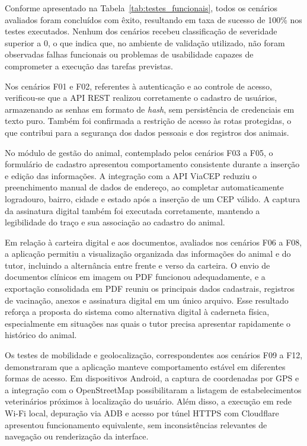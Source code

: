\documentclass{UNESC}
\begin{document}
Conforme apresentado na Tabela~\ref{tab:testes_funcionais}, todos os cenários avaliados foram concluídos com êxito, resultando em taxa de sucesso de 100\% nos testes executados. Nenhum dos cenários recebeu classificação de severidade superior a 0, o que indica que, no ambiente de validação utilizado, não foram observadas falhas funcionais ou problemas de usabilidade capazes de comprometer a execução das tarefas previstas.

Nos cenários F01 e F02, referentes à autenticação e ao controle de acesso, verificou-se que a API REST realizou corretamente o cadastro de usuários, armazenando as senhas em formato de \textit{hash}, sem persistência de credenciais em texto puro. Também foi confirmada a restrição de acesso às rotas protegidas, o que contribui para a segurança dos dados pessoais e dos registros dos animais.

No módulo de gestão do animal, contemplado pelos cenários F03 a F05, o formulário de cadastro apresentou comportamento consistente durante a inserção e edição das informações. A integração com a API ViaCEP reduziu o preenchimento manual de dados de endereço, ao completar automaticamente logradouro, bairro, cidade e estado após a inserção de um CEP válido. A captura da assinatura digital também foi executada corretamente, mantendo a legibilidade do traço e sua associação ao cadastro do animal.

Em relação à carteira digital e aos documentos, avaliados nos cenários F06 a F08, a aplicação permitiu a visualização organizada das informações do animal e do tutor, incluindo a alternância entre frente e verso da carteira. O envio de documentos clínicos em imagem ou PDF funcionou adequadamente, e a exportação consolidada em PDF reuniu os principais dados cadastrais, registros de vacinação, anexos e assinatura digital em um único arquivo. Esse resultado reforça a proposta do sistema como alternativa digital à caderneta física, especialmente em situações nas quais o tutor precisa apresentar rapidamente o histórico do animal.

Os testes de mobilidade e geolocalização, correspondentes aos cenários F09 a F12, demonstraram que a aplicação manteve comportamento estável em diferentes formas de acesso. Em dispositivos Android, a captura de coordenadas por GPS e a integração com o OpenStreetMap possibilitaram a listagem de estabelecimentos veterinários próximos à localização do usuário. Além disso, a execução em rede Wi-Fi local, depuração via ADB e acesso por túnel HTTPS com Cloudflare apresentou funcionamento equivalente, sem inconsistências relevantes de navegação ou renderização da interface.
\end{document}
